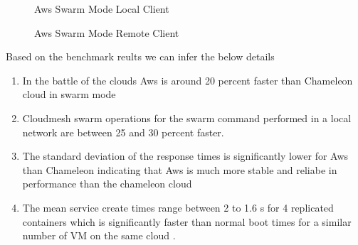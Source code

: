 \documentclass[9pt,twocolumn,twoside]{../../styles/osajnl}
\begin{document}
\begin{figure}[h]
\centering
{}
\caption{Aws Swarm Mode Local Client}
\label{fig:Aws-Swarm-Mode-Local-Client}
\end{figure}


\begin{figure}[h]
\centering
{}
\caption{Aws Swarm Mode Remote Client}
\label{fig:Aws-Swarm-Mode-Remote-Client}
\end{figure}

Based on the benchmark reults we can infer the below details
\begin{enumerate}
\item  In the battle of the clouds Aws is around 20 percent faster than Chameleon cloud in swarm mode
\item  Cloudmesh swarm operations for the swarm command performed in a local network are between
25 and 30  percent faster.
\item The standard deviation of the response times is significantly lower for Aws than Chameleon indicating 
that Aws is much more stable and reliabe in performance than the chameleon cloud
\item The mean service create times range between 2 to 1.6 s for 4 replicated containers 
which is significantly faster than normal boot times for a similar number of VM on the same  cloud .
\end{enumerate}
\end{document}
